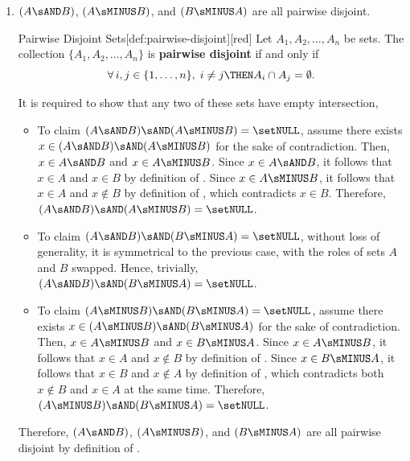\begin{enumerate}
\begin{enumerate}
    \item $(A \sAND B)$, $(A \sMINUS B)$, and $(B \sMINUS A)$ are all pairwise disjoint. \label{prob:partite-b}
    \begin{define}{Pairwise Disjoint Sets}[def:pairwise-disjoint][red]
      Let $A_1, A_2, \ldots, A_n$ be sets. The collection $\{A_1, A_2, \ldots, A_n\}$ 
      is \textbf{pairwise disjoint} if and only if
      \[
        \forall\, i, j \in \{1, \ldots, n\},\; i \neq j \THEN A_i \cap A_j = \emptyset.
      \]
    \end{define}
    \begin{subprove}
      It is required to show that any two of these sets have empty intersection,
      \begin{itemize}
        \item To claim $(A \sAND B) \sAND (A \sMINUS B) = \setNULL$,
        assume there exists $x \in (A \sAND B) \sAND (A \sMINUS B)$ for 
        the sake of contradiction. Then, $x \in A \sAND B$ and $x \in A \sMINUS B$. 
        Since $x \in A \sAND B$, it follows that $x \in A$ and $x \in B$ by definition of . 
        Since $x \in A \sMINUS B$, it follows that $x \in A$ and $x \notin B$ by definition of , 
        which contradicts $x \in B$. Therefore, $(A \sAND B) \sAND (A \sMINUS B) = \setNULL$.
        \item To claim $(A \sAND B) \sAND (B \sMINUS A) = \setNULL$, without loss of generality, 
        it is symmetrical to the previous case, with the roles of sets $A$ and $B$ swapped.
        Hence, trivially, $(A \sAND B) \sAND (B \sMINUS A) = \setNULL$.
        \item To claim $(A \sMINUS B) \sAND (B \sMINUS A) = \setNULL$,
        assume there exists $x \in (A \sMINUS B) \sAND (B \sMINUS A)$ for 
        the sake of contradiction. Then, $x \in A \sMINUS B$ and $x \in B \sMINUS A$. 
        Since $x \in A \sMINUS B$, it follows that $x \in A$ and $x \notin B$ by definition of . 
        Since $x \in B \sMINUS A$, it follows that $x \in B$ and $x \notin A$ by definition of , 
        which contradicts both $x \notin B$ and $x \in A$ at the same time. 
        Therefore, $(A \sMINUS B) \sAND (B \sMINUS A) = \setNULL$.
      \end{itemize}
      Therefore, $(A \sAND B)$, $(A \sMINUS B)$, and $(B \sMINUS A)$ are all pairwise disjoint by definition of .
    \end{subprove}



\end{enumerate}
\end{enumerate}
